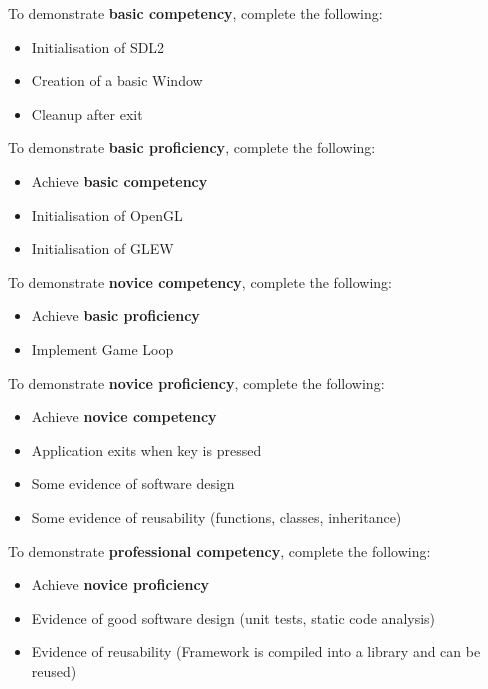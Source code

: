\documentclass{../../../fal_assignment}
\begin{document}
To demonstrate \textbf{basic competency}, complete the following:
\begin{itemize}
	\item Initialisation of SDL2
	\item Creation of a basic Window
	\item Cleanup after exit
\end{itemize} 

To demonstrate \textbf{basic proficiency}, complete the following:
\begin{itemize}
	\item Achieve \textbf{basic competency}
	\item Initialisation of OpenGL
	\item Initialisation of GLEW
\end{itemize}

To demonstrate \textbf{novice competency}, complete the following:
\begin{itemize}
	\item Achieve \textbf{basic proficiency}
	\item Implement Game Loop
\end{itemize}

To demonstrate \textbf{novice proficiency}, complete the following:
\begin{itemize}
	\item Achieve \textbf{novice competency}
	\item Application exits when key is pressed
	\item Some evidence of software design
	\item Some evidence of reusability (functions, classes, inheritance) 
\end{itemize}

To demonstrate \textbf{professional competency}, complete the following:
\begin{itemize}
	\item Achieve \textbf{novice proficiency}
	\item Evidence of good software design (unit tests, static code analysis)
	\item Evidence of reusability (Framework is compiled into a library and can be reused)
\end{itemize}
\end{document}
